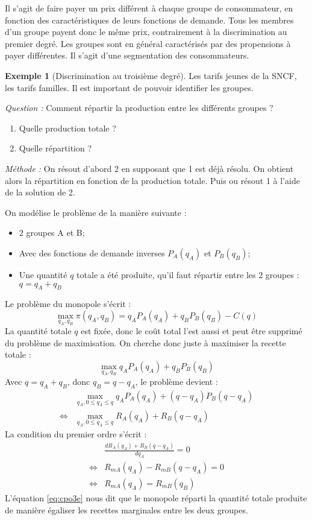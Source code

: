 \documentclass[
  a4paper,
]{book}
\providecommand{\tightlist}{%
  \setlength{\itemsep}{0pt}\setlength{\parskip}{0pt}}
\theoremstyle{definition}
\theoremstyle{definition}
\newtheorem{example}{Exemple}[chapter]
\theoremstyle{definition}
\theoremstyle{definition}
\theoremstyle{remark}
\begin{document}
Il s'agit de faire payer un prix différent à chaque groupe de consommateur, en fonction des caractéristiques de leurs fonctions de demande.
Tous les membres d'un groupe payent donc le même prix, contrairement à la discrimination au premier degré.
Les groupes sont en général caractérisés par des propensions à payer différentes.
Il s'agit d'une segmentation des consommateurs.

\begin{example}[Discrimination au troisième degré]
Les tarifs jeunes de la SNCF, les tarifs familles.
Il est important de pouvoir identifier les groupes.
\end{example}

\emph{Question :} Comment répartir la production entre les différents groupes ?

\begin{enumerate}
\def\labelenumi{\arabic{enumi}.}
\tightlist
\item
  Quelle production totale ?
\item
  Quelle répartition ?
\end{enumerate}

\emph{Méthode :} On résout d'abord 2 en supposant que 1 est déjà résolu.
On obtient alors la répartition en fonction de la production totale.
Puis ou résout 1 à l'aide de la solution de 2.

On modélise le problème de la manière suivante :

\begin{itemize}
\tightlist
\item
  2 groupes A et B;
\item
  Avec des fonctions de demande inverses \(P_A(q_A)\) et \(P_B(q_B)\);
\item
  Une quantité \(q\) totale a été produite, qu'il faut répartir entre les 2 groupes : \(q=q_A+q_B\)
\end{itemize}

Le problème du monopole s'écrit :
\[
\max_{q_A, q_B} \pi(q_A, q_B) = q_AP_A(q_A) + q_BP_B(q_B) -C(q)
\]
La quantité totale \(q\) est fixée, donc le coût total l'est aussi et peut être supprimé du problème de maximisation.
On cherche donc juste à maximiser la recette totale :
\[
\max_{q_A, q_B} q_AP_A(q_A) + q_BP_B(q_B) 
\]
Avec \(q=q_A+q_B\), donc \(q_B=q-q_A\), le problème devient :
\[
\begin{array}{rl}
&\max_{q_A, 0\leq q_A\leq q} q_AP_A(q_A) + (q-q_A)P_B(q-q_A) \\
\Leftrightarrow &\max_{q_A, 0\leq q_A\leq q} R_A(q_A) + R_B(q-q_A) 
\end{array}
\]
La condition du premier ordre s'écrit :
\[
\begin{array}{rl}
&\frac{dR_A(q_A) + R_B(q-q_A) }{dq_A} = 0\\
\Leftrightarrow & R_{mA}(q_A) - R_{mB}(q-q_A) = 0\\
\Leftrightarrow & R_{mA}(q_A) = R_{mB}(q_B) 
\label{eq:cpo3e}
\end{array}
\]
L'équation \eqref{eq:cpo3e} nous dit que le monopole réparti la quantité totale produite de manière égaliser les recettes marginales entre les deux groupes.
\end{document}
